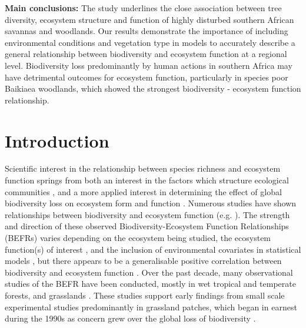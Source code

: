 \documentclass[11pt,a4paper]{article}
\begin{document}
\textbf{Main conclusions:} The study underlines the close association between tree diversity, ecosystem structure and function of highly disturbed southern African savannas and woodlands. Our results demonstrate the importance of including environmental conditions and vegetation type in models to accurately describe a general relationship between biodiversity and ecosystem function at a regional level. Biodiversity loss predominantly by human actions in southern Africa may have detrimental outcomes for ecosystem function, particularly in species poor Baikiaea woodlands, which showed the strongest biodiversity - ecosystem function relationship.


\section*{Introduction}

Scientific interest in the relationship between species richness and ecosystem function springs from both an interest in the factors which structure ecological communities \citep{}, and a more applied interest in determining the effect of global biodiversity loss on ecosystem form and function \citep{}. Numerous studies have shown relationships between biodiversity and ecosystem function (e.g. \citealt{Liang2016, Hooper2012, Cardinale2009}). The strength and direction of these observed Biodiversity-Ecosystem Function Relationships (BEFRs) varies depending on the ecosystem being studied, the ecosystem function(s) of interest \citep{Hector2007}, and the inclusion of environmental covariates in statistical models \citep{Vila2005}, but there appears to be a generalisable positive correlation between biodiversity and ecosystem function \citep{Liang2016}. Over the past decade, many observational studies of the BEFR have been conducted, mostly in wet tropical and temperate forests, and grasslands \citep{Chen2011}. These studies support early findings from small scale experimental studies predominantly in grassland patches, which began in earnest during the 1990s as concern grew over the global loss of biodiversity \citep{Tilman1994, Tilman2014}.
\end{document}
